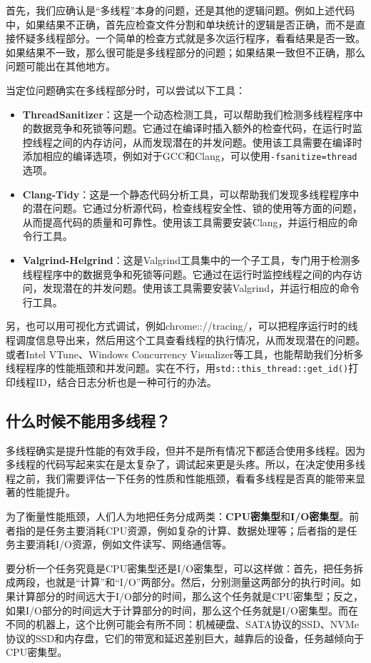 首先，我们应确认是“多线程”本身的问题，还是其他的逻辑问题。例如上述代码中，如果结果不正确，首先应检查文件分割和单块统计的逻辑是否正确，而不是直接怀疑多线程部分。一个简单的检查方式就是多次运行程序，看看结果是否一致。如果结果不一致，那么很可能是多线程部分的问题；如果结果一致但不正确，那么问题可能出在其他地方。

当定位问题确实在多线程部分时，可以尝试以下工具：
\begin{itemize}
    \item \textbf{ThreadSanitizer}：这是一个动态检测工具，可以帮助我们检测多线程程序中的数据竞争和死锁等问题。它通过在编译时插入额外的检查代码，在运行时监控线程之间的内存访问，从而发现潜在的并发问题。使用该工具需要在编译时添加相应的编译选项，例如对于GCC和Clang，可以使用\texttt{-fsanitize=thread}选项。
    \item \textbf{Clang-Tidy}：这是一个静态代码分析工具，可以帮助我们发现多线程程序中的潜在问题。它通过分析源代码，检查线程安全性、锁的使用等方面的问题，从而提高代码的质量和可靠性。使用该工具需要安装Clang，并运行相应的命令行工具。
    \item \textbf{Valgrind-Helgrind}：这是Valgrind工具集中的一个子工具，专门用于检测多线程程序中的数据竞争和死锁等问题。它通过在运行时监控线程之间的内存访问，发现潜在的并发问题。使用该工具需要安装Valgrind，并运行相应的命令行工具。
\end{itemize}

另，也可以用可视化方式调试，例如chrome:://tracing/，可以把程序运行时的线程调度信息导出来，然后用这个工具查看线程的执行情况，从而发现潜在的问题。或者Intel VTune、Windows Concurrency Visualizer等工具，也能帮助我们分析多线程程序的性能瓶颈和并发问题。实在不行，用\texttt{std::this\_thread::get\_id()}打印线程ID，结合日志分析也是一种可行的办法。

\subsection{什么时候不能用多线程？}

多线程确实是提升性能的有效手段，但并不是所有情况下都适合使用多线程。因为多线程的代码写起来实在是太复杂了，调试起来更是头疼。所以，在决定使用多线程之前，我们需要评估一下任务的性质和性能瓶颈，看看多线程是否真的能带来显著的性能提升。

为了衡量性能瓶颈，人们人为地把任务分成两类：\textbf{CPU密集型}和\textbf{I/O密集型}。前者指的是任务主要消耗CPU资源，例如复杂的计算、数据处理等；后者指的是任务主要消耗I/O资源，例如文件读写、网络通信等。

要分析一个任务究竟是CPU密集型还是I/O密集型，可以这样做：首先，把任务拆成两段，也就是“计算”和“I/O”两部分。然后，分别测量这两部分的执行时间。如果计算部分的时间远大于I/O部分的时间，那么这个任务就是CPU密集型；反之，如果I/O部分的时间远大于计算部分的时间，那么这个任务就是I/O密集型。而在不同的机器上，这个比例可能会有所不同：机械硬盘、SATA协议的SSD、NVMe协议的SSD和内存盘，它们的带宽和延迟差别巨大，越靠后的设备，任务越倾向于CPU密集型。

